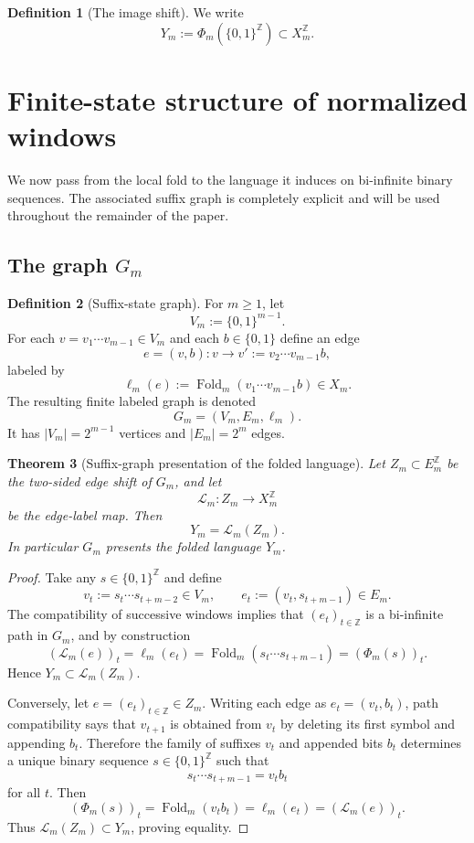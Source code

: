 \documentclass[11pt,letterpaper]{article}
\numberwithin{equation}{section}
\theoremstyle{plain}
\newtheorem{theorem}{Theorem}[section]
\theoremstyle{definition}
\newtheorem{definition}[theorem]{Definition}
\theoremstyle{remark}
\newcommand{\ZZ}{\mathbb{Z}}
\DeclareMathOperator{\Fold}{Fold}
\begin{document}
\begin{definition}[The image shift]
\label{def:Y-m}
We write
\[
Y_m:=\Phi_m(\{0,1\}^{\ZZ})\subset X_m^{\ZZ}.
\]
\end{definition}

\section{Finite-state structure of normalized windows}

We now pass from the local fold to the language it induces on bi-infinite
binary sequences.  The associated suffix graph is completely explicit and will
be used throughout the remainder of the paper.

\subsection{The graph \texorpdfstring{$G_m$}{Gm}}

\begin{definition}[Suffix-state graph]
\label{def:G-m}
For $m\ge 1$, let
\[
V_m:=\{0,1\}^{m-1}.
\]
For each $v=v_1\cdots v_{m-1}\in V_m$ and each $b\in\{0,1\}$ define an edge
\[
e=(v,b):v\to v':=v_2\cdots v_{m-1}b,
\]
labeled by
\[
\ell_m(e):=\Fold_m(v_1\cdots v_{m-1}b)\in X_m.
\]
The resulting finite labeled graph is denoted
\[
G_m=(V_m,E_m,\ell_m).
\]
It has $\lvert V_m\rvert=2^{m-1}$ vertices and $\lvert E_m\rvert=2^m$ edges.
\end{definition}

\begin{theorem}[Suffix-graph presentation of the folded language]
\label{thm:Phi-m-sofic-graph}
Let $Z_m\subset E_m^{\ZZ}$ be the two-sided edge shift of $G_m$, and let
\[
\mathcal L_m:Z_m\to X_m^{\ZZ}
\]
be the edge-label map.  Then
\[
Y_m=\mathcal L_m(Z_m).
\]
In particular $G_m$ presents the folded language $Y_m$.
\end{theorem}

\begin{proof}
Take any $s\in\{0,1\}^{\ZZ}$ and define
\[
v_t:=s_t\cdots s_{t+m-2}\in V_m,
\qquad
e_t:=(v_t,s_{t+m-1})\in E_m.
\]
The compatibility of successive windows implies that $(e_t)_{t\in\ZZ}$ is a
bi-infinite path in $G_m$, and by construction
\[
(\mathcal L_m(e))_t
=
\ell_m(e_t)
=
\Fold_m(s_t\cdots s_{t+m-1})
=
(\Phi_m(s))_t.
\]
Hence $Y_m\subset \mathcal L_m(Z_m)$.

Conversely, let $e=(e_t)_{t\in\ZZ}\in Z_m$.  Writing each edge as
$e_t=(v_t,b_t)$, path compatibility says that $v_{t+1}$ is obtained from $v_t$
by deleting its first symbol and appending $b_t$.  Therefore the family of
suffixes $v_t$ and appended bits $b_t$ determines a unique binary sequence
$s\in\{0,1\}^{\ZZ}$ such that
\[
s_t\cdots s_{t+m-1}=v_tb_t
\]
for all $t$.  Then
\[
(\Phi_m(s))_t
=
\Fold_m(v_tb_t)
=
\ell_m(e_t)
=
(\mathcal L_m(e))_t.
\]
Thus $\mathcal L_m(Z_m)\subset Y_m$, proving equality.
\end{proof}
\end{document}
